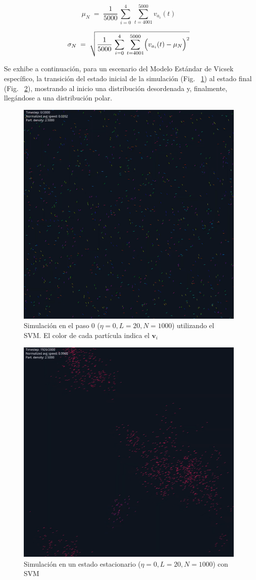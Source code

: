 \documentclass{article}
\begin{document}
\[
\mu_{N} \;=\; \frac{1}{5000}\,\sum_{i=0}^{4}\,\sum_{t=4001}^{5000} v_{a_i}(t)
\]

\[
\sigma_{N} \;=\; \sqrt{\frac{1}{5000}\,\sum_{i=0}^{4}\,\sum_{t=4001}^{5000}\Bigl(v_{a_i}(t)-\mu_{N}\Bigr)^2}
\]



Se exhibe a continuación, para un escenario del Modelo Estándar de Vicsek específico, la transición del estado inicial de la simulación (Fig. ~\ref{fig:1}) al estado final (Fig. ~\ref{fig:2}), mostrando al inicio una distribución desordenada y, finalmente, llegándose a una distribución polar.
\begin{figure}[H]
    \centering
    \includegraphics[width=0.75\linewidth]{simulation_example_t0.png}
    \caption{Simulación en el paso 0 (\(\eta=0, L=20, N=1000\)) utilizando el SVM. El color de cada partícula indica el \(\mathbf v_i\)}
    \label{fig:1}
\end{figure}

\begin{figure}[H]
    \centering    \includegraphics[width=0.75\linewidth]{animation_example.png}
    \caption{Simulación en un estado estacionario (\(\eta=0, L=20, N=1000\)) con SVM}
    \label{fig:2}
\end{figure}
\end{document}

